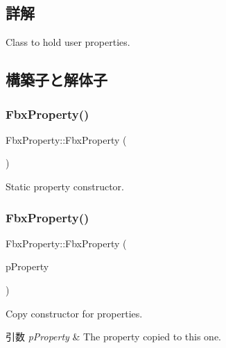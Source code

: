 \subsection{詳解}
Class to hold user properties. 

\subsection{構築子と解体子}
\mbox{\label{class_fbx_property_ac6f4561fd451ab81b93de09dd463e356}} 
\subsubsection{\texorpdfstring{Fbx\+Property()}{FbxProperty()}\hspace{0.1cm}{\footnotesize\ttfamily [1/5]}}
{\footnotesize\ttfamily Fbx\+Property\+::\+Fbx\+Property (\begin{DoxyParamCaption}{ }\end{DoxyParamCaption})}

Static property constructor. \mbox{\label{class_fbx_property_aaff1233681e54f5e8d70e695c2bdd2ca}} 
\subsubsection{\texorpdfstring{Fbx\+Property()}{FbxProperty()}\hspace{0.1cm}{\footnotesize\ttfamily [2/5]}}
{\footnotesize\ttfamily Fbx\+Property\+::\+Fbx\+Property (\begin{DoxyParamCaption}\item[{const \hyperlink{class_fbx_property}{Fbx\+Property} \&}]{p\+Property }\end{DoxyParamCaption})}

Copy constructor for properties. 
\begin{DoxyParams}{引数}
{\em p\+Property} & The property copied to this one. \\
\hline
\end{DoxyParams}
\mbox{\label{class_fbx_property_afaf9ebfe81538ea7948fde0d617f3408}} 
